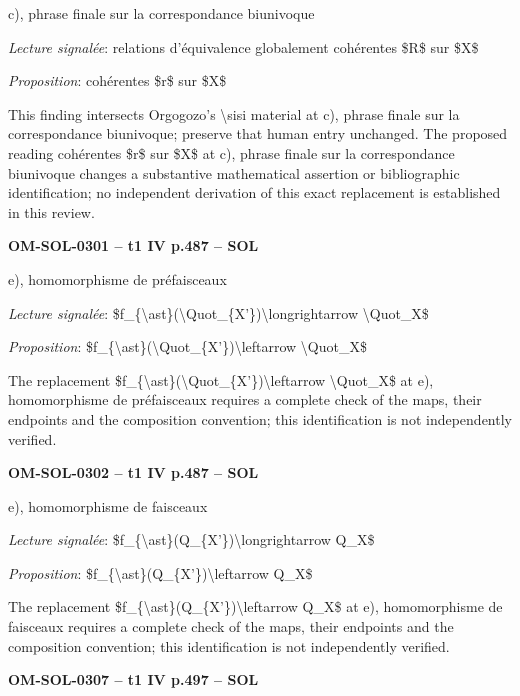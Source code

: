 c), phrase finale sur la correspondance biunivoque\par
\emph{Lecture signalée}: relations d'équivalence globalement cohérentes \$R\$ sur \$X\$\par
\emph{Proposition}: cohérentes \$r\$ sur \$X\$\par
This finding intersects Orgogozo's \textbackslash{}sisi material at c), phrase finale sur la correspondance biunivoque; preserve that human entry unchanged. The proposed reading cohérentes \$r\$ sur \$X\$ at c), phrase finale sur la correspondance biunivoque changes a substantive mathematical assertion or bibliographic identification; no independent derivation of this exact replacement is established in this review.\par
\par\noindent\textbf{OM-SOL-0301 -- t1 IV p.487 -- SOL}\par
e), homomorphisme de préfaisceaux\par
\emph{Lecture signalée}: \$f\_\{\textbackslash{}ast\}(\textbackslash{}Quot\_\{X'\})\textbackslash{}longrightarrow \textbackslash{}Quot\_X\$\par
\emph{Proposition}: \$f\_\{\textbackslash{}ast\}(\textbackslash{}Quot\_\{X'\})\textbackslash{}leftarrow \textbackslash{}Quot\_X\$\par
The replacement \$f\_\{\textbackslash{}ast\}(\textbackslash{}Quot\_\{X'\})\textbackslash{}leftarrow \textbackslash{}Quot\_X\$ at e), homomorphisme de préfaisceaux requires a complete check of the maps, their endpoints and the composition convention; this identification is not independently verified.\par
\par\noindent\textbf{OM-SOL-0302 -- t1 IV p.487 -- SOL}\par
e), homomorphisme de faisceaux\par
\emph{Lecture signalée}: \$f\_\{\textbackslash{}ast\}(Q\_\{X'\})\textbackslash{}longrightarrow Q\_X\$\par
\emph{Proposition}: \$f\_\{\textbackslash{}ast\}(Q\_\{X'\})\textbackslash{}leftarrow Q\_X\$\par
The replacement \$f\_\{\textbackslash{}ast\}(Q\_\{X'\})\textbackslash{}leftarrow Q\_X\$ at e), homomorphisme de faisceaux requires a complete check of the maps, their endpoints and the composition convention; this identification is not independently verified.\par
\par\noindent\textbf{OM-SOL-0307 -- t1 IV p.497 -- SOL}\par
